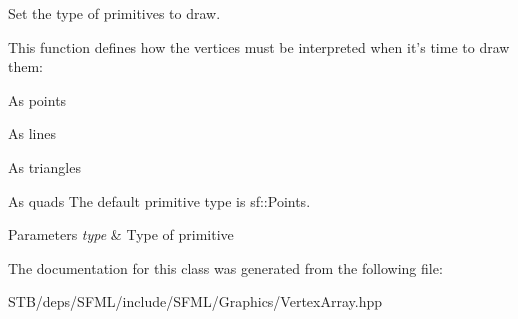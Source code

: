 Set the type of primitives to draw. 

This function defines how the vertices must be interpreted when it's time to draw them\+: \begin{DoxyItemize}
\item As points \item As lines \item As triangles \item As quads The default primitive type is sf\+::\+Points.\end{DoxyItemize}

\begin{DoxyParams}{Parameters}
{\em type} & Type of primitive \\
\hline
\end{DoxyParams}


The documentation for this class was generated from the following file\+:\begin{DoxyCompactItemize}
\item 
S\+T\+B/deps/\+S\+F\+M\+L/include/\+S\+F\+M\+L/\+Graphics/Vertex\+Array.\+hpp\end{DoxyCompactItemize}
